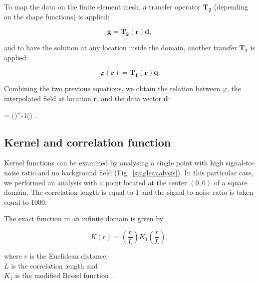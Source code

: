 To map the data on the finite element mesh, a transfer operator $\mathbf{T_{2}}$ (depending on the shape functions) is applied:

\[\mathbf{g}=\mathbf{T_2}(\mathbf{r})\mathbf{d},\]

and to have the solution at any location inside the domain, another transfer $\mathbf{T_{1}}$ is applied:

\[\boldsymbol{\varphi}(\mathbf{r})=\mathbf{T_1}(\mathbf{r})\mathbf{q}.\]

Combining the two previous equations, we obtain the relation between $\varphi$, the interpolated field at location $\mathbf{r}$,  and the data vector $\mathbf{d}$:

\be
\boldsymbol{\varphi} = ()^{-1}() .
\label{eq:solution2}
\ee


\subsection{Kernel and correlation function \label{sec:kernel}}

Kernel functions  can be examined by analysing a single point with high signal-to-noise ratio and no background field (Fig.~\ref{singleanalysis}). In this particular case, we performed an analysis with a point located at the center $(0,0)$ of a square domain. The correlation length is equal to $1$ and the signal-to-noise ratio is taken equal to $1000$.

The exact function in an infinite domain is given by 

\begin{equation}
K(r)=\left(\frac{r}{L}\right)K_{1}\left(\frac{r}{L}\right),
\label{kernelfunction}
\end{equation}

where $r$ is the Euclidean distance,\\ 
\hphantom{where} $L$ is the correlation length  and \\
\hphantom{where} $K_{1}$ is the modified Bessel function \citep[][page 359]{ABRAMOWITZ64}.

%
%
%
%
%
%
%

